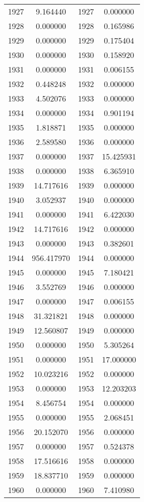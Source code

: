 \documentclass[12pt]{article}
\begin{document}
\begin{longtable}{@{}cccc@{}}
1927 & 9.164440 & 1927 & 0.000000 \\
1928 & 0.000000 & 1928 & 0.165986 \\
1929 & 0.000000 & 1929 & 0.175404 \\
1930 & 0.000000 & 1930 & 0.158920 \\
1931 & 0.000000 & 1931 & 0.006155 \\
1932 & 0.448248 & 1932 & 0.000000 \\
1933 & 4.502076 & 1933 & 0.000000 \\
1934 & 0.000000 & 1934 & 0.901194 \\
1935 & 1.818871 & 1935 & 0.000000 \\
1936 & 2.589580 & 1936 & 0.000000 \\
1937 & 0.000000 & 1937 & 15.425931 \\
1938 & 0.000000 & 1938 & 6.365910 \\
1939 & 14.717616 & 1939 & 0.000000 \\
1940 & 3.052937 & 1940 & 0.000000 \\
1941 & 0.000000 & 1941 & 6.422030 \\
1942 & 14.717616 & 1942 & 0.000000 \\
1943 & 0.000000 & 1943 & 0.382601 \\
1944 & 956.417970 & 1944 & 0.000000 \\
1945 & 0.000000 & 1945 & 7.180421 \\
1946 & 3.552769 & 1946 & 0.000000 \\
1947 & 0.000000 & 1947 & 0.006155 \\
1948 & 31.321821 & 1948 & 0.000000 \\
1949 & 12.560807 & 1949 & 0.000000 \\
1950 & 0.000000 & 1950 & 5.305264 \\
1951 & 0.000000 & 1951 & 17.000000 \\
1952 & 10.023216 & 1952 & 0.000000 \\
1953 & 0.000000 & 1953 & 12.203203 \\
1954 & 8.456754 & 1954 & 0.000000 \\
1955 & 0.000000 & 1955 & 2.068451 \\
1956 & 20.152070 & 1956 & 0.000000 \\
1957 & 0.000000 & 1957 & 0.524378 \\
1958 & 17.516616 & 1958 & 0.000000 \\
1959 & 18.837710 & 1959 & 0.000000 \\
1960 & 0.000000 & 1960 & 7.410980 \\

\end{longtable}
\end{document}
